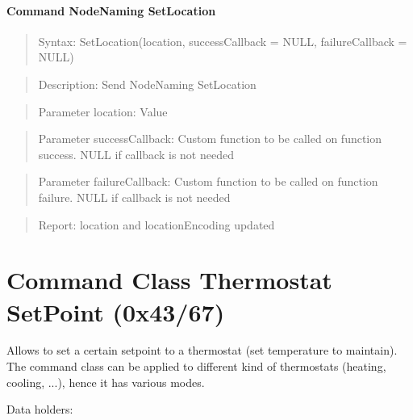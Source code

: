 \paragraph{Command NodeNaming SetLocation}
\begin{quote}Syntax: SetLocation(location, successCallback = NULL, failureCallback = NULL)\end{quote}
\begin{quote}Description: Send NodeNaming SetLocation\end{quote}
\begin{quote}Parameter location: Value\end{quote}
\begin{quote}Parameter successCallback: Custom function to be called on function success. NULL if callback is not needed\end{quote}
\begin{quote}Parameter failureCallback: Custom function to be called on function failure. NULL if callback is not needed\end{quote}
\begin{quote}Report: location and locationEncoding updated\end{quote}


\section{Command Class Thermostat SetPoint (0x43/67)}

Allows to set a certain setpoint to a thermostat (set temperature to maintain). The command class can be applied to different kind of thermostats (heating, cooling, ...), hence it has various modes.
\newline

\noindent
Data holders:

